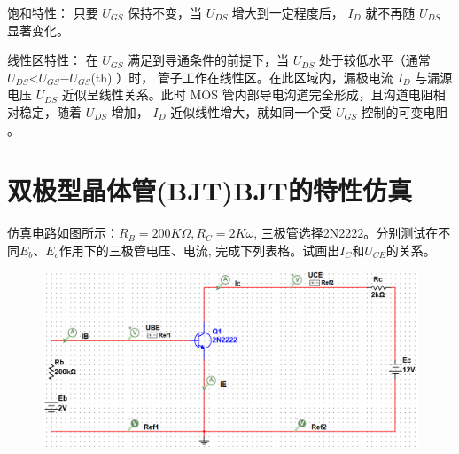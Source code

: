 \documentclass[10pt, a4paper]{article} %
\begin{document}
饱和特性：
只要 $U_{GS}$ 保持不变，当 $U_{DS}$ 增大到一定程度后， $I_{D}$ 就不再随 $U_{DS}$ 显著变化。

线性区特性：
在 $U_{GS}$ 满足到导通条件的前提下，当 $U_{DS}$ 处于较低水平（通常 $U_{DS}$<$U_{GS}$−$U_{GS}$(th) ）时， 管子工作在线性区。在此区域内，漏极电流 $I_{D}$ 与漏源电压 $U_{DS}$ 近似呈线性关系。此时 MOS 管内部导电沟道完全形成，且沟道电阻相对稳定，随着 $U_{DS}$ 增加， $I_{D}$ 近似线性增大，就如同一个受 $U_{GS}$ 控制的可变电阻 。


\newpage

\section{双极型晶体管(BJT)BJT的特性仿真}
仿真电路如图所示：$R_B = 200K\Omega, R_C = 2K \omega $, 三极管选择2N2222。分别测试在不同$E_b$、$E_c$作用下的三极管电压、电流, 完成下列表格。试画出$I_C$和$U_{CE}$的关系。

\begin{figure}[ht]
    \centering
    \includegraphics[width=0.8\linewidth]{image/2.png}
    \label{b}
\end{figure}
\end{document}
